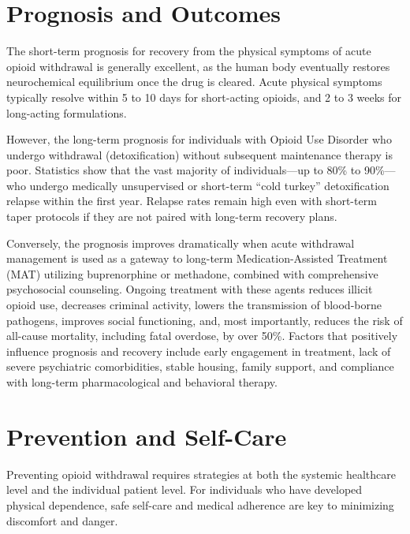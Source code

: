 \section*{Prognosis and Outcomes}
The short-term prognosis for recovery from the physical symptoms of acute opioid withdrawal is generally excellent, as the human body eventually restores neurochemical equilibrium once the drug is cleared. Acute physical symptoms typically resolve within 5 to 10 days for short-acting opioids, and 2 to 3 weeks for long-acting formulations.

However, the long-term prognosis for individuals with Opioid Use Disorder who undergo withdrawal (detoxification) without subsequent maintenance therapy is poor. Statistics show that the vast majority of individuals—up to 80\% to 90\%—who undergo medically unsupervised or short-term ``cold turkey'' detoxification relapse within the first year. Relapse rates remain high even with short-term taper protocols if they are not paired with long-term recovery plans.

Conversely, the prognosis improves dramatically when acute withdrawal management is used as a gateway to long-term Medication-Assisted Treatment (MAT) utilizing buprenorphine or methadone, combined with comprehensive psychosocial counseling. Ongoing treatment with these agents reduces illicit opioid use, decreases criminal activity, lowers the transmission of blood-borne pathogens, improves social functioning, and, most importantly, reduces the risk of all-cause mortality, including fatal overdose, by over 50\%. Factors that positively influence prognosis and recovery include early engagement in treatment, lack of severe psychiatric comorbidities, stable housing, family support, and compliance with long-term pharmacological and behavioral therapy.

\section*{Prevention and Self-Care}
Preventing opioid withdrawal requires strategies at both the systemic healthcare level and the individual patient level. For individuals who have developed physical dependence, safe self-care and medical adherence are key to minimizing discomfort and danger.

